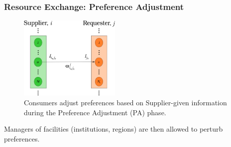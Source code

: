 \begin{frame}[ctb!]
  \frametitle{Resource Exchange: Preference Adjustment}
  \begin{figure}
    \includegraphics[height=4cm]{./images/supplier-requester.eps}
    \caption{Consumers adjust preferences based on Supplier-given information
      during the Preference Adjustment (PA) phase.}
  \end{figure}

  Managers of facilities (institutions, regions) are then allowed to perturb
  preferences.
\end{frame}





  

